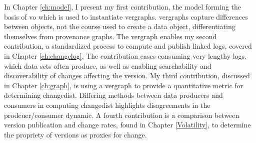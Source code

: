 In Chapter \ref{ch:model}, I present my first contribution, the model forming the basis of \gls{vo} which is used to instantiate \glspl{vergraph}.
\Glspl{vergraph} capture differences between objects, not the course used to create a data object, differentiating themselves from provenance graphs.
The \gls{vergraph} enables my second contribution, a standardized process to compute and publish \gls{linked} \glspl{log}, covered in Chapter \ref{ch:changelog}.
The contribution eases consuming very lengthy logs, which data sets often produce, as well as enabling searchability and discoverability of \glspl{change} affecting the \gls{version}.
My third contribution, discussed in Chapter \ref{ch:graph}, is using a \gls{vergraph} to provide a quantitative metric for determining \gls{changedist}.
Differing methods between data producers and consumers in computing \gls{changedist} highlights disagreements in the prodcuer/consumer dynamic.
A fourth contribution is a comparison between version publication and change rates, found in Chapter \ref{Volatility}, to determine the propriety of versions as proxies for change.

